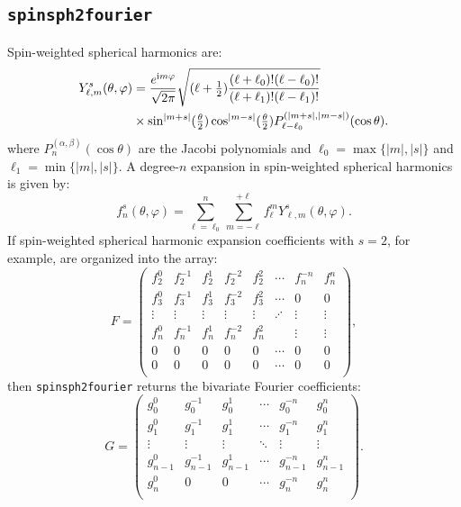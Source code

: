 \documentclass{article}
\def\ii{{\rm i}}
\def\abs#1{\left|{#1}\right|}
\begin{document}
\subsection{{\tt spinsph2fourier}}

Spin-weighted spherical harmonics are:
\begin{align}
Y_{\ell,m}^s(\theta,\varphi) & = \frac{e^{\ii m\varphi}}{\sqrt{2\pi}} \sqrt{(\ell+\tfrac{1}{2})\dfrac{(\ell+\ell_0)!(\ell-\ell_0)!}{(\ell+\ell_1)!(\ell-\ell_1)!}}\nonumber\\
& \times \sin^{\abs{m+s}}(\tfrac{\theta}{2})\cos^{\abs{m-s}}(\tfrac{\theta}{2}) P_{\ell-\ell_0}^{(\abs{m+s},\abs{m-s})}(\cos\theta).
\end{align}
where $P_n^{(\alpha,\beta)}(\cos\theta)$ are the Jacobi polynomials and $\ell_0 = \max\{\abs{m},\abs{s}\}$ and $\ell_1 = \min\{\abs{m},\abs{s}\}$. A degree-$n$ expansion in spin-weighted spherical harmonics is given by:
\begin{equation}
f_n^s(\theta,\varphi) = \sum_{\ell=\ell_0}^{n}\sum_{m=-\ell}^{+\ell} f_\ell^m Y_{\ell,m}^s(\theta,\varphi).
\end{equation}
If spin-weighted spherical harmonic expansion coefficients with $s=2$, for example, are organized into the array:
\begin{equation}
F = \begin{pmatrix}
f_2^0 & f_2^{-1} & f_2^1 & f_2^{-2} & f_2^2 & \cdots & f_n^{-n} & f_n^n\\
f_3^0 & f_3^{-1} & f_3^1 & f_3^{-2} & f_3^2 & \cdots & 0 & 0\\
\vdots & \vdots & \vdots &  \vdots &  \vdots & \iddots & \vdots & \vdots\\
f_{n}^0 & f_{n}^{-1} & f_{n}^1 & f_n^{-2} & f_n^2 &  & \vdots & \vdots\\
0 & 0 & 0 & 0 & 0 & \cdots & 0 & 0\\
0 & 0 & 0 & 0 & 0 & \cdots & 0 & 0\\
\end{pmatrix},
\end{equation}
then {\tt spinsph2fourier} returns the bivariate Fourier coefficients:
\begin{equation}
G = \begin{pmatrix}
g_0^0 & g_0^{-1} & g_0^1 & \cdots & g_0^{-n} & g_0^n\\
g_1^0 & g_1^{-1} & g_1^1 & \cdots & g_1^{-n} & g_1^n\\
\vdots & \vdots & \vdots & \ddots & \vdots & \vdots\\
g_{n-1}^0 & g_{n-1}^{-1} & g_{n-1}^1& \cdots & g_{n-1}^{-n} & g_{n-1}^n\\
g_n^0 & 0 & 0 & \cdots & g_n^{-n} & g_n^n\\
\end{pmatrix}.
\end{equation}
\end{document}
